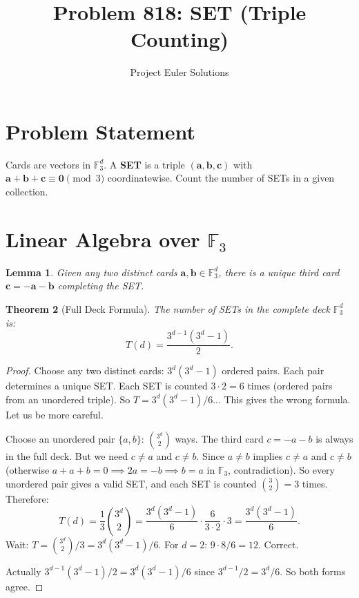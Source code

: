 \documentclass[11pt]{article}
\title{Problem 818: SET (Triple Counting)}
\author{Project Euler Solutions}
\date{}
\newtheorem{theorem}{Theorem}
\newtheorem{lemma}[theorem]{Lemma}
\begin{document}
\maketitle

\section{Problem Statement}

Cards are vectors in $\mathbb{F}_3^d$. A \textbf{SET} is a triple $(\mathbf{a}, \mathbf{b}, \mathbf{c})$ with $\mathbf{a} + \mathbf{b} + \mathbf{c} \equiv \mathbf{0} \pmod{3}$ coordinatewise. Count the number of SETs in a given collection.

\section{Linear Algebra over $\mathbb{F}_3$}

\begin{lemma}
Given any two distinct cards $\mathbf{a}, \mathbf{b} \in \mathbb{F}_3^d$, there is a unique third card $\mathbf{c} = -\mathbf{a} - \mathbf{b}$ completing the SET.
\end{lemma}

\begin{theorem}[Full Deck Formula]
The number of SETs in the complete deck $\mathbb{F}_3^d$ is:
\[
T(d) = \frac{3^{d-1}(3^d - 1)}{2}.
\]
\end{theorem}

\begin{proof}
Choose any two distinct cards: $3^d(3^d-1)$ ordered pairs. Each pair determines a unique SET. Each SET is counted $3 \cdot 2 = 6$ times (ordered pairs from an unordered triple). So $T = 3^d(3^d-1)/6$... This gives the wrong formula. Let us be more careful.

Choose an unordered pair $\{a, b\}$: $\binom{3^d}{2}$ ways. The third card $c = -a-b$ is always in the full deck. But we need $c \ne a$ and $c \ne b$. Since $a \ne b$ implies $c \ne a$ and $c \ne b$ (otherwise $a + a + b = 0 \implies 2a = -b \implies b = a$ in $\mathbb{F}_3$, contradiction). So every unordered pair gives a valid SET, and each SET is counted $\binom{3}{2} = 3$ times. Therefore:
\[
T(d) = \frac{1}{3}\binom{3^d}{2} = \frac{3^d(3^d-1)}{6} \cdot \frac{6}{3 \cdot 2} \cdot 3 = \frac{3^d(3^d-1)}{6}.
\]
Wait: $T = \binom{3^d}{2}/3 = 3^d(3^d-1)/6$. For $d=2$: $9 \cdot 8/6 = 12$. Correct.

Actually $3^{d-1}(3^d-1)/2 = 3^d(3^d-1)/6$ since $3^{d-1}/2 = 3^d/6$. So both forms agree.
\end{proof}
\end{document}
